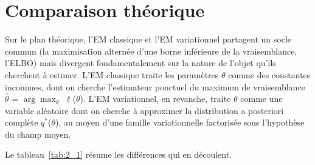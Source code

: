 \section{Comparaison théorique}\label{sec:comparaison_theorique}
Sur le plan théorique, l'EM classique et l'EM variationnel partagent un socle commun (la maximisation alternée d'une borne inférieure de la vraisemblance, l'ELBO) mais divergent fondamentalement sur la nature de l'objet qu'ils cherchent à estimer. L'EM classique traite les paramètres $\theta $ comme des constantes inconnues, dont on cherche l'estimateur ponctuel du maximum de vraisemblance $\hat{\theta }$ = $\arg\max_{\theta}$ $\ell $($\theta $). L'EM variationnel, en revanche, traite $\theta $ comme une variable aléatoire dont on cherche à approximer la distribution a posteriori complète $q^{*}$($\theta $), au moyen d'une famille variationnelle factorisée sous l'hypothèse du champ moyen.

Le tableau~\ref{tab:2_1} résume les différences qui en découlent.

